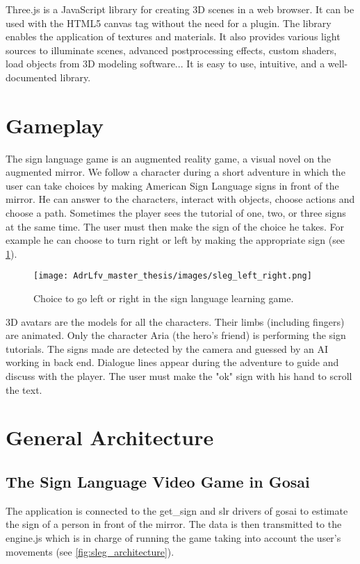 Three.js is a JavaScript library for creating 3D scenes in a web browser. It can be used with the HTML5 canvas tag without the need for a plugin. The library enables the application of textures and materials. It also provides various light sources to illuminate scenes, advanced postprocessing effects, custom shaders, load objects from 3D modeling software... It is easy to use, intuitive, and a well-documented library.

\section{Gameplay}

The sign language game is an augmented reality game, a visual novel on the augmented mirror. We follow a character during a short adventure in which the user can take choices by making American Sign Language signs in front of the mirror. He can answer to the characters, interact with objects, choose actions and choose a path. 
Sometimes the player sees the tutorial of one, two, or three signs at the same time. The user must then make the sign of the choice he takes. For example he can choose to turn right or left by making the appropriate sign (see \ref{fig:sleg_left_right}). 

\begin{figure}[h]
    \centering
    \texttt{[image: AdrLfv\_master\_thesis/images/sleg\_left\_right.png]}
    \caption{Choice to go left or right in the sign language learning game.}
    \label{fig:sleg_left_right}
\end{figure}

3D avatars are the models for all the characters. Their limbs (including fingers) are animated. Only the character Aria (the hero's friend) is performing the sign tutorials.
The signs made are detected by the camera and guessed by an AI working in back end. Dialogue lines appear during the adventure to guide and discuss with the player. The user must make the "ok" sign with his hand to scroll the text.


\section{General Architecture}

\subsection{The Sign Language Video Game in Gosai}

The application is connected to the get\_sign and slr drivers of gosai to estimate the sign of a person in front of the mirror. The data is then transmitted to the engine.js which is in charge of running the game taking into account the user's movements (see \ref{fig:sleg_architecture}).

